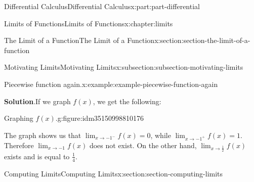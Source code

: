 \documentclass[twoside,10pt,]{tufte-book}
\newcommand{\blocktitlefont}{\relax}
\numberwithin{equation}{part}
\begin{document}
\begin{partptx}{Differential Calculus}{}{Differential Calculus}{}{}{x:part:part-differential}
\begin{chapterptx}{Limits of Functions}{}{Limits of Functions}{}{}{x:chapter:limits}
\begin{sectionptx}{The Limit of a Function}{}{The Limit of a Function}{}{}{x:section:section-the-limit-of-a-function}
\begin{subsectionptx}{Motivating Limits}{}{Motivating Limits}{}{}{x:subsection:subsection-motivating-limits}
\begin{example}{Piecewise function again.}{x:example:example-piecewise-function-again}
\par\smallskip%
\noindent\textbf{\blocktitlefont Solution}.\hypertarget{g:solution:idm35150998810944}{}\quad{}If we graph \(f(x)\), we get the following:%
\begin{figureptx}{Graphing \(f(x)\).}{g:figure:idm35150998810176}{}%
\begin{image}{0.25}{0.5}{0.25}%
%
\end{image}%
\tcblower
\end{figureptx}%
The graph shows us that \(\lim_{x\to-1^{-}}f(x) = 0\), while \(\lim_{x\to-1^{+}}f(x) = 1\). Therefore \(\lim_{x\to-1}f(x)\) does not exist. On the other hand, \(\lim_{x\to\frac{1}{2}}f(x)\) exists and is equal to \(\frac{1}{4}\).%
\end{example}
\end{subsectionptx}
\end{sectionptx}
%
%
\typeout{************************************************}
\typeout{************************************************}
%
\begin{sectionptx}{Computing Limits}{}{Computing Limits}{}{}{x:section:section-computing-limits}
\begin{introduction}{}%

\end{introduction}
\end{sectionptx}
\end{chapterptx}
\end{partptx}
\end{document}
